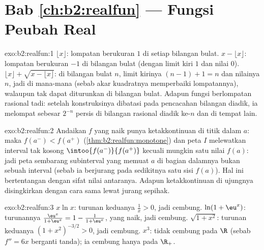 \section*{Bab \ref{ch:b2:realfun} --- Fungsi Peubah Real}

\begin{solution}{exo:b2:realfun:1}
$\lfloor x\rfloor$: lompatan berukuran $1$ di setiap bilangan bulat. $x -
\lfloor x\rfloor$: lompatan berukuran $-1$ di bilangan bulat (dengan
limit kiri $1$ dan nilai $0$). $\lfloor x\rfloor + \sqrt{x - \lfloor
x\rfloor}$: di bilangan bulat $n$, limit kirinya $(n - 1) + 1 = n$ dan
nilainya $n$, jadi \emph{} di mana-mana (sebab akar kuadratnya
memperbaiki lompatannya), walaupun tak dapat diturunkan di bilangan
bulat. Adapun fungsi berlompatan rasional tadi: setelah konstruksinya
dibatasi pada pencacahan bilangan diadik, ia melompat sebesar $2^{-n}$
persis di bilangan rasional diadik ke-$n$ dan  di tempat lain.
\end{solution}

\begin{solution}{exo:b2:realfun:2}
Andaikan $f$ yang naik punya ketakkontinuan di titik dalam $a$: maka
$f(a^-) < f(a^+)$ (\cref{thm:b2:realfun:monotone}) dan peta
$I$ melewatkan interval  tak kosong
$\intoo{f(a^-)}{f(a^+)}$ kecuali mungkin satu nilai $f(a)$:
jadi peta sembarang subinterval yang memuat $a$ di bagian dalamnya bukan
sebuah interval (sebab ia berjurang pada sedikitnya satu sisi $f(a)$).
Hal ini bertentangan dengan sifat nilai antaranya. Adapun ketakkontinuan
di ujungnya disingkirkan dengan cara sama lewat jurang sepihak.
\end{solution}

\begin{solution}{exo:b2:realfun:3}
$x\ln x$: turunan keduanya $\frac1x > 0$, jadi cembung. $\ln(1 +
\eu^x)$: turunannya $\frac{\eu^x}{1 + \eu^x} = 1 - \frac{1}{1 +
\eu^x}$, yang naik, jadi cembung. $\sqrt{1 + x^2}$: turunan keduanya
$(1 + x^2)^{-3/2} > 0$, jadi cembung. $x^3$: tidak cembung pada $\R$
(sebab $f'' = 6x$ berganti tanda); ia cembung hanya pada $\R_+$.
\end{solution}

